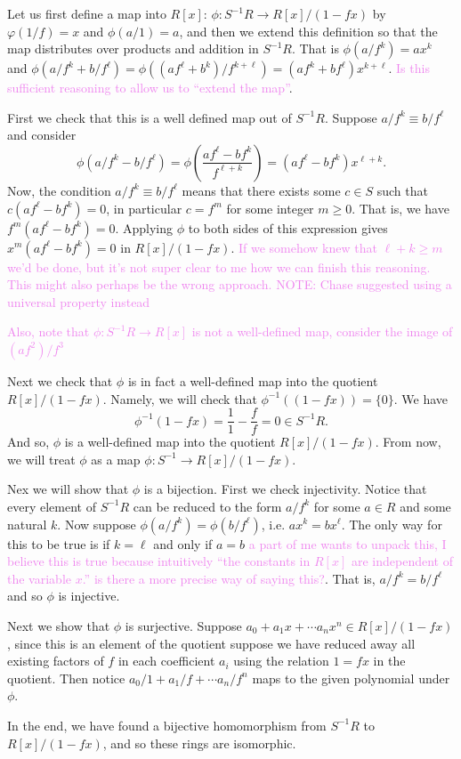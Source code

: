 \documentclass[12pt,letterpaper,boxed]{hmcpset}
\newcommand{\wg}[1]{\textcolor{violet}{#1}}
\newcommand{\inv}{^{-1}}
\begin{document}
\begin{solution}
Let us first define a map into $R[x]$: $\phi: S\inv R \to R[x]/(1-fx)$ by 
$\varphi(1/f) = x$ and $\phi(a/1) = a$, and then we extend this
definition so that the map distributes over products and addition in
$S\inv R$. That is $\phi(a/f^k) = ax^k$ and $\phi(a/f^k + b/f^\ell) =
\phi((af^\ell + b^k)/f^{k+\ell}) = (af^k + bf^\ell)x^{k+\ell}$. 
\wg{Is this sufficient reasoning to allow us to ``extend the map''}.

First we check that this is a well defined map out of $S\inv R$. 
Suppose $a/f^k \equiv b/f^\ell$ and consider
\[
	\phi(a/f^k - b/f^\ell) = \phi(\frac{af^\ell - bf^k}{f^{\ell+k}})
		= (af^\ell - bf^k)x^{\ell+k}.
\]
Now, the condition $a/f^k \equiv b/f^\ell$ means that there exists
some $c \in S$ such that $c(af^\ell - bf^k) = 0$, in particular $c =
f^m$ for some integer $m \geq 0$. That is, we have $f^m(af^\ell -
bf^k) = 0$. Applying $\phi$ to both sides of this expression gives
$x^m(af^\ell - bf^k) = 0$ in $R[x]/(1-fx)$. \wg{If we somehow knew that $\ell
+ k \geq m$ we'd be done, but it's not super clear to me how we can
finish this reasoning. This might also perhaps be the wrong approach.
NOTE: Chase suggested using a universal property instead}

\wg{Also, note that $\phi: S\inv R \to R[x]$ is not a well-defined
map, consider the image of $(af^2)/f^3$}

Next we check that $\phi$ is in fact a well-defined map into the
quotient $R[x]/(1-fx)$. Namely, we will check that $\phi\inv((1-fx)) =
\{0\}$. We have \[
	\phi\inv(1-fx) = \frac{1}{1} - \frac{f}{f} = 0 \in S\inv R. 
\]
And so, $\phi$ is a well-defined map into the quotient $R[x]/(1-fx)$.
From now, we will treat $\phi$ as a map $\phi: S\inv \to R[x]/(1-fx)$.

Nex we will show that $\phi$ is a bijection. First we check
injectivity. Notice that every element of $S\inv R$ can be reduced to
the form $a/f^k$ for some $a \in R$ and some natural $k$. Now suppose
$\phi(a/f^k) = \phi(b/f^\ell)$, i.e. $ax^k = bx^\ell$. The only way
for this to be true is if $k = \ell$ and only if $a = b$ \wg{a part of
me wants to unpack this, I believe this is true because intuitively
``the constants in $R[x]$ are independent of the variable $x$.'' is
there a more precise way of saying this?}.
That is, $a/f^k = b/f^\ell$ and so $\phi$ is injective.

Next we show that $\phi$ is surjective. Suppose
$a_0 + a_1x + \cdots a_nx^n \in R[x]/(1-fx)$, since this is an element
of the quotient suppose we have reduced away all existing factors of
$f$ in each coefficient $a_i$ using the relation $1 = fx$ in the
quotient.
Then notice $a_0/1 +
a_1/f + \cdots a_n/f^n$ maps to the given polynomial under $\phi$.

In the end, we have found a bijective homomorphism from $S\inv R$ to
$R[x]/(1-fx)$, and so these rings are isomorphic. 
\end{solution}
\end{document}
